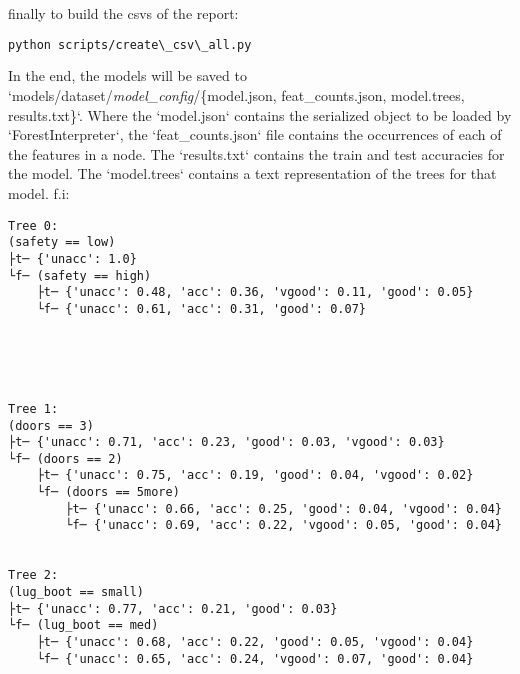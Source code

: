finally to build the csvs of the report:

\begin{lstlisting}[language=bash]
python scripts/create\_csv\_all.py
\end{lstlisting}

In the end, the models will be saved to \\ `models/dataset/\textit{model\_config}/\{model.json, feat\_counts.json, model.trees, results.txt\}`. Where the `model.json` contains the serialized object to be loaded by `ForestInterpreter`, the `feat\_counts.json` file contains the occurrences of each of the features in a node. The `results.txt` contains the train and test accuracies for the model. The `model.trees` contains a text representation of the trees for that model. f.i:

\begin{verbatim}
Tree 0:
(safety == low)
├t─ {'unacc': 1.0}
└f─ (safety == high)
    ├t─ {'unacc': 0.48, 'acc': 0.36, 'vgood': 0.11, 'good': 0.05}
    └f─ {'unacc': 0.61, 'acc': 0.31, 'good': 0.07}





Tree 1:
(doors == 3)
├t─ {'unacc': 0.71, 'acc': 0.23, 'good': 0.03, 'vgood': 0.03}
└f─ (doors == 2)
    ├t─ {'unacc': 0.75, 'acc': 0.19, 'good': 0.04, 'vgood': 0.02}
    └f─ (doors == 5more)
        ├t─ {'unacc': 0.66, 'acc': 0.25, 'good': 0.04, 'vgood': 0.04}
        └f─ {'unacc': 0.69, 'acc': 0.22, 'vgood': 0.05, 'good': 0.04}


Tree 2:
(lug_boot == small)
├t─ {'unacc': 0.77, 'acc': 0.21, 'good': 0.03}
└f─ (lug_boot == med)
    ├t─ {'unacc': 0.68, 'acc': 0.22, 'good': 0.05, 'vgood': 0.04}
    └f─ {'unacc': 0.65, 'acc': 0.24, 'vgood': 0.07, 'good': 0.04}
\end{verbatim}